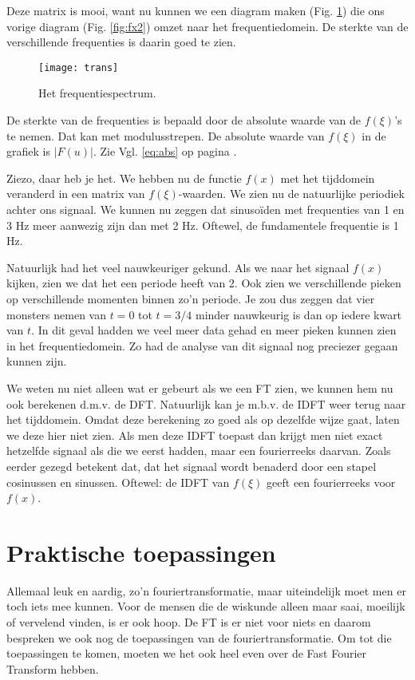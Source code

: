 \documentclass[11pt,fleqn]{book} %
\begin{document}
Deze matrix is mooi, want nu kunnen we een diagram maken (Fig. \ref{fig:trans}) die ons vorige diagram (Fig. \ref{fig:fx2}) omzet naar het frequentiedomein. De sterkte van de verschillende frequenties is daarin goed te zien.

\begin{figure}[h]
	\centering\texttt{[image: trans]}
	\caption{Het frequentiespectrum.}
	\label{fig:trans}
\end{figure}

De sterkte van de frequenties is bepaald door de absolute waarde van de $f(\xi)$'s te nemen. Dat kan met modulusstrepen. De absolute waarde van $f(\xi)$ in de grafiek is $\left|F(u)\right|$. Zie Vgl. \ref{eq:abs} op pagina \pageref{eq:abs}.

Ziezo, daar heb je het. We hebben nu de functie $f(x)$ met het tijddomein veranderd in een matrix van $f(\xi)$-waarden. We zien nu de natuurlijke periodiek achter ons signaal. We kunnen nu zeggen dat sinusoïden met frequenties van 1 en 3 Hz meer aanwezig zijn dan met 2 Hz. Oftewel, de fundamentele frequentie is 1 Hz.

Natuurlijk had het veel nauwkeuriger gekund. Als we naar het signaal $f(x)$ kijken, zien we dat het een periode heeft van 2. Ook zien we verschillende pieken op verschillende momenten binnen zo’n periode. Je zou dus zeggen dat vier monsters nemen van $t=0$ tot $t=3/4$ minder nauwkeurig is dan op iedere kwart van $t$. In dit geval hadden we veel meer data gehad en meer pieken kunnen zien in het frequentiedomein. Zo had de analyse van dit signaal nog preciezer gegaan kunnen zijn.

We weten nu niet alleen wat er gebeurt als we een FT zien, we kunnen hem nu ook berekenen d.m.v. de DFT. Natuurlijk kan je m.b.v. de IDFT weer terug naar het tijddomein. Omdat deze berekening zo goed als op dezelfde wijze gaat, laten we deze hier niet zien. Als men deze IDFT toepast dan krijgt men niet exact hetzelfde signaal als die we eerst hadden, maar een fourierreeks daarvan. Zoals eerder gezegd  betekent dat, dat het signaal wordt benaderd door een stapel cosinussen en sinussen. Oftewel: de IDFT van $f(\xi)$ geeft een fourierreeks voor $f(x)$.

\section{Praktische toepassingen}
Allemaal leuk en aardig, zo’n fouriertransformatie, maar uiteindelijk moet men er toch iets mee kunnen. Voor de mensen die de wiskunde alleen maar saai, moeilijk of vervelend vinden, is er ook hoop. De FT is er niet voor niets en daarom bespreken we ook nog de toepassingen van de fouriertransformatie. Om tot die toepassingen te komen, moeten we het ook heel even over de Fast Fourier Transform hebben.
\end{document}
